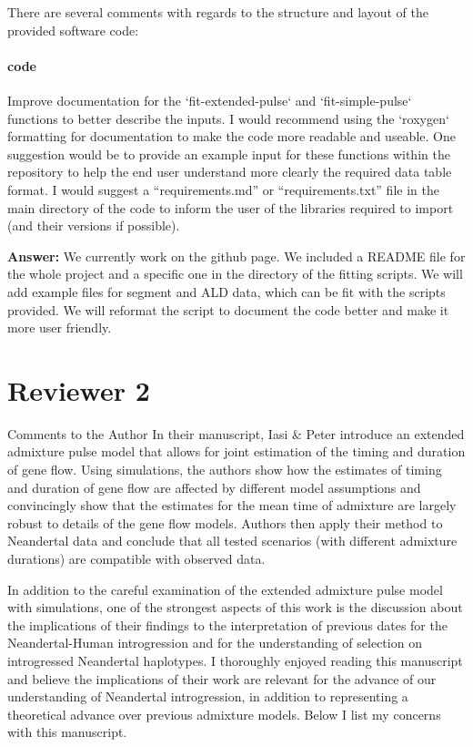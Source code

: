 \documentclass[11pt]{article}
\let\oldparagraph\paragraph
\renewcommand{\paragraph}[1]{\oldparagraph{#1}\mbox{}}
\begin{document}
There are several comments with regards to the structure and layout of the provided software code:


\paragraph{code}
Improve documentation for the `fit-extended-pulse` and `fit-simple-pulse` functions to better describe the inputs. I would recommend using the `roxygen` formatting for documentation to make the code more readable and useable. 
One suggestion would be to provide an example input for these functions within the repository to help the end user understand more clearly the required data table format. 
I would suggest a “requirements.md” or “requirements.txt” file in the main directory of the code to inform the user of the libraries required to import (and their versions if possible).

\textbf{Answer:} We currently work on the github page. We included a README file for the whole project and a specific one in the directory of the fitting scripts. We will add example files for segment and ALD data, which can be fit with the scripts provided. We will reformat the script to document the code better and make it more user friendly. 

\section{Reviewer 2}\label{Reviewer 2}
Comments to the Author
In their manuscript, Iasi \& Peter introduce an extended admixture pulse model that allows for joint estimation of the timing and duration of gene flow. Using simulations, the authors show how the estimates of timing and duration of gene flow are affected by different model assumptions and convincingly show that the estimates for the mean time of admixture are largely robust to details of the gene flow models. Authors then apply their method to Neandertal data and conclude that all tested scenarios (with different admixture durations) are compatible with observed data.

In addition to the careful examination of the extended admixture pulse model with simulations, one of the strongest aspects of this work is the discussion about the implications of their findings to the interpretation of previous dates for the Neandertal-Human introgression and for the understanding of selection on introgressed Neandertal haplotypes. I thoroughly enjoyed reading this manuscript and believe the implications of their work are relevant for the advance of our understanding of Neandertal introgression, in addition to representing a theoretical advance over previous admixture models. Below I list my concerns with this manuscript. 
\end{document}
